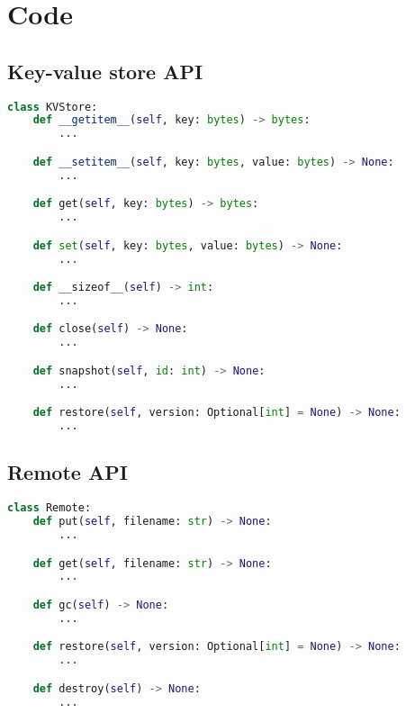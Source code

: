 

\chapter{Code} %
\label{Appendix-A-code} %

\section{Key-value store API}

\begin{lstlisting}[language=Python, caption=Key-value store API - method signatures.]
class KVStore:
    def __getitem__(self, key: bytes) -> bytes:
        ...

    def __setitem__(self, key: bytes, value: bytes) -> None:
        ...

    def get(self, key: bytes) -> bytes:
        ...

    def set(self, key: bytes, value: bytes) -> None:
        ...

    def __sizeof__(self) -> int:
        ...

    def close(self) -> None:
        ...

    def snapshot(self, id: int) -> None:
        ...

    def restore(self, version: Optional[int] = None) -> None:
        ...
\end{lstlisting}

\section{Remote API}

\begin{lstlisting}[language=Python, caption=Remote API - method signatures.]
class Remote:
    def put(self, filename: str) -> None:
        ...

    def get(self, filename: str) -> None:
        ...

    def gc(self) -> None:
        ...

    def restore(self, version: Optional[int] = None) -> None:
        ...

    def destroy(self) -> None:
        ...
\end{lstlisting}



